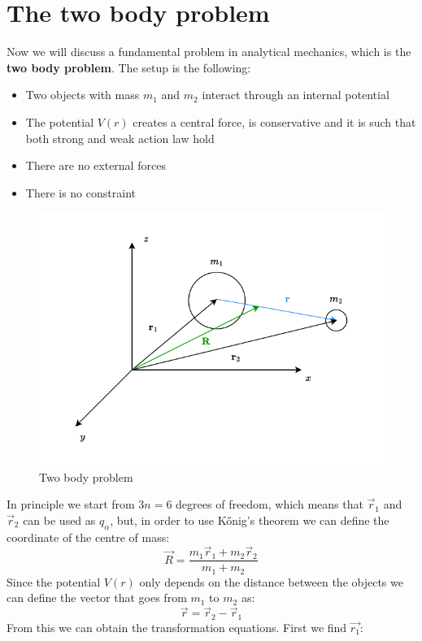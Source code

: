 \section{The two body problem}
Now we will discuss a fundamental problem in analytical mechanics, which is the \textbf{two body problem}. The setup is the following:
\begin{itemize}
    \item Two objects with mass $m_1$ and $m_2$ interact through an internal potential
    \item The potential $V(r)$ creates a central force, is conservative and it is such that both strong and weak action law hold
    \item There are no external forces
    \item There is no constraint
\end{itemize}
\begin{figure}[H]
  \centering
  \includegraphics[width=0.8\linewidth]{res/svg/two_body_problem_start.drawio}
  \caption{Two body problem}
\end{figure}
In principle we start from $3n= 6$ degrees of freedom, which means that $\vec{r}_1$ and $\vec{r}_2$ can be used as $q_{\alpha}$, but, in order to use Kőnig's theorem we can define the coordinate of the centre of mass:
\begin{equation}
  \vec{R} = \dfrac{m_1\vec{r}_1 + m_2\vec{r}_2}{m_1 + m_2}
\end{equation}
Since the potential $V(r)$ only depends on the distance between the objects we can define the vector that goes from $m_1$ to $m_2$ as:
\begin{equation}
  \vec{r} = \vec{r}_2 - \vec{r}_1
\end{equation}
From this we can obtain the transformation equations. First we find $\vec{r_1}$:

